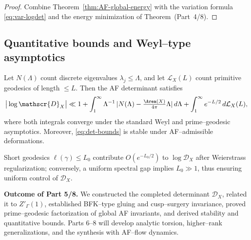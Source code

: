 \begin{proof}
Combine Theorem~\ref{thm:AF-global-energy} with the variation formula \eqref{eq:var-logdet} and the energy minimization of Theorem~(Part~4/8). %
\end{proof}

\subsection{Quantitative bounds and Weyl–type asymptotics}
\label{subsec:bounds}
\relax\hspace{0pt}

Let $N(\Lambda)$ count discrete eigenvalues $\lambda_j\le \Lambda$, and let $\mathcal{L}_X(L)$ count primitive geodesics of length $\le L$. Then the AF determinant satisfies
\begin{equation}\label{eq:det-bounds}
\big|\log\mathscr{D}_X\big|
\ll 1 + \int_1^\infty \Lambda^{-1}\,|N(\Lambda)-\tfrac{\Area(X)}{4\pi}\Lambda|\,d\Lambda
+ \int_1^\infty e^{-L/2}\, d\mathcal{L}_X(L),
\end{equation}
where both integrals converge under the standard Weyl and prime–geodesic asymptotics. Moreover, \eqref{eq:det-bounds} is stable under AF–admissible deformations.

\begin{remark}
Short geodesics $\ell(\gamma)\le L_0$ contribute $O(e^{-L_0/2})$ to $\log\mathscr{D}_X$ after Weierstrass regularization; conversely, a uniform spectral gap implies $L_0\gg 1$, thus ensuring uniform control of $\mathscr{D}_X$. %
\end{remark}


\noindent\textbf{Outcome of Part 5/8.}
We constructed the completed determinant $\mathscr{D}_X$, related it to $Z'_\Gamma(1)$, established BFK–type gluing and cusp–surgery invariance, proved prime–geodesic factorization of global AF invariants, and derived stability and quantitative bounds. Parts 6–8 will develop analytic torsion, higher–rank generalizations, and the synthesis with AF–flow dynamics. %


